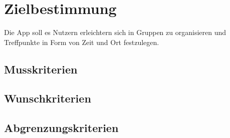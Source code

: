 \section{Zielbestimmung}
Die App soll es Nutzern erleichtern sich in Gruppen zu organisieren
und Treffpunkte in Form von Zeit und Ort festzulegen.
\subsection{Musskriterien}
\subsection{Wunschkriterien}
\subsection{Abgrenzungskriterien}
